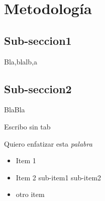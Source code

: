 \section{Metodología}

\subsection{Sub-seccion1}
Bla,blalb,a
\subsection{Sub-seccion2}
BlaBla
\begin{flushleft}
Escribo sin tab
\end{flushleft}
Quiero enfatizar esta \emph{palabra}
\begin{itemize}
\item Item 1
\item Item 2
\subitem sub-item1
\subitem sub-item2
\item otro item
\end{itemize}









